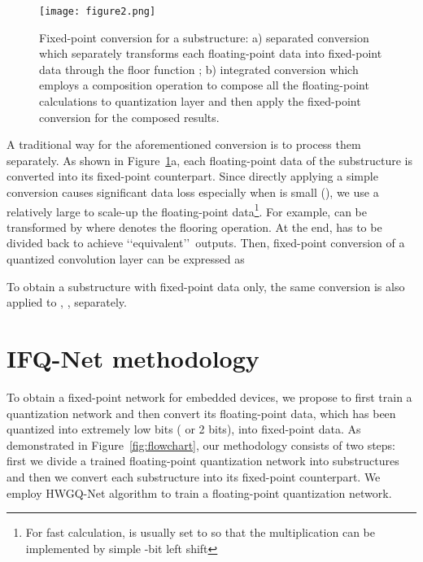 \documentclass[10pt,twocolumn,letterpaper]{article}
\begin{document}
\begin{figure}[t]
\begin{center}
\texttt{[image: figure2.png]}
\end{center}
\caption{Fixed-point conversion for a substructure: a) separated conversion which separately transforms each floating-point data into fixed-point data through the floor function  ; b) integrated conversion which employs a composition operation  to compose all the floating-point calculations to quantization layer and then apply the fixed-point conversion for the composed results.}
\label{fig:fixpoint}
\end{figure}

A traditional way for the aforementioned conversion is to process them separately. As shown in Figure~\ref{fig:fixpoint}a, each floating-point data of the substructure is converted into its fixed-point counterpart. Since directly applying a simple conversion causes significant data loss especially when  is small (), we use a relatively large  to scale-up the floating-point data\footnote{For fast calculation,  is usually set to  so that the multiplication can be implemented by simple -bit left shift}. For example,  can be transformed by  where  denotes the flooring operation. At the end,  has to be divided back to achieve \lq\lq equivalent\rq\rq\, outputs. Then, fixed-point conversion of a quantized convolution layer can be expressed as 





To obtain a substructure with fixed-point data only, the same conversion   is also applied to , ,  separately.

\section{IFQ-Net methodology}

To obtain a fixed-point network for embedded devices, we propose to first train a quantization network and then convert its floating-point data, which has been quantized into extremely low bits ( or 2 bits), into fixed-point data. As demonstrated in Figure~\ref{fig:flowchart}, our methodology consists of two steps: first we divide a trained floating-point quantization network into substructures and then we convert each substructure into its fixed-point counterpart. We employ HWGQ-Net algorithm to train a floating-point quantization network.
\end{document}
